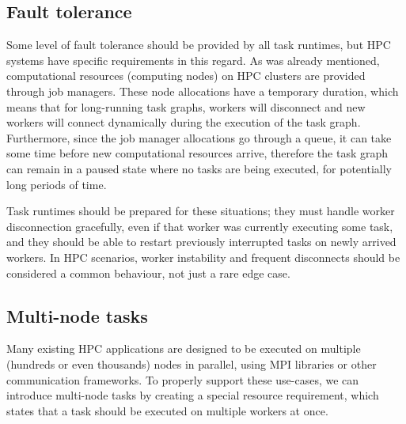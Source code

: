 \subsection{Fault tolerance}
Some level of fault tolerance should be provided by all task runtimes, but HPC systems have
specific requirements in this regard. As was already mentioned, computational resources
(computing nodes) on HPC clusters are provided through job managers. These node allocations have
a temporary duration, which means that for long-running task graphs, workers will disconnect and
new workers will connect dynamically during the execution of the task graph. Furthermore, since
the job manager allocations go through a queue, it can take some time before new computational
resources arrive, therefore the task graph can remain in a paused state where no tasks are being
executed, for potentially long periods of time.

Task runtimes should be prepared for these situations; they must handle worker disconnection
gracefully, even if that worker was currently executing some task, and they should be able to
restart previously interrupted tasks on newly arrived workers. In HPC scenarios, worker
instability and frequent disconnects should be considered a common behaviour, not just a rare
edge case.

\subsection{Multi-node tasks}
Many existing HPC applications are designed to be executed on multiple (hundreds or even
thousands) nodes in parallel, using MPI libraries or other communication frameworks. To properly
support these use-cases, we can introduce multi-node tasks by creating a special resource
requirement, which states that a task should be executed on multiple workers at once.

